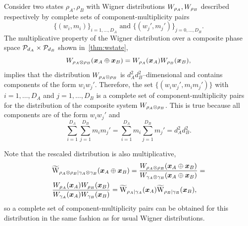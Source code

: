 Consider two states $\rho_A, \rho_B$ with Wigner distributions $\W{\rho_A}, \W{\rho_B}$ described respectively by complete sets of component-multiplicity pairs 
\begin{equation}
	\{(w_i, m_i)\}_{i=1,\dots,D_A} \text{ and } \{(w_j', m_j')\}_{j=0,\dots,D_B}.
\end{equation}
The multiplicative property of the Wigner distribution over a composite phase space $\cal{P}_{d_A} \times \cal{P}_{d_B}$ shown in~\cref{thm:wstate},
\begin{equation}
	\W[\bmx_A \oplus \bmx_B]{\rho_A \otimes \rho_B} = \W[\bmx_A]{\rho_A}\W[\bmx_B]{\rho_B},
\end{equation}
implies that the distribution $\W{\rho_A \otimes \rho_B}$ is $d_A^2 d_B^2$--dimensional and contains components of the form $w_i w_j'$. 
Therefore, the set $\{(w_i w_j', m_i m_j')\}$ with $i=1,\dots,D_A$ and $j=1,\dots,D_B$ is a complete set of component-multiplicity pairs for the distribution of the composite system $\W{\rho_A \otimes \rho_B}$.
This is true because all components are of the form $w_i w_j'$ and 
\begin{equation*}
	\sum_{i=1}^{D_A}\sum_{j=1}^{D_B} m_i m_j' = \sum_{i=1}^{D_A} m_i \sum_{j=1}^{D_B} m_j' = d_A^2 d_B^2.
\end{equation*}

Note that the rescaled distribution is also multiplicative,
\begin{align}
	&\widetilde{\rm{W}}_{\rho_A \otimes \rho_B | \gamma_A \otimes \gamma_B}(\bmx_A \oplus \bmx_B) = \frac{\W[\bmx_A \oplus \bmx_B]{\rho_A \otimes \rho_B}}{\W[\bmx_A \oplus \bmx_B]{\gamma_A \otimes \gamma_B}} = \nonumber \\
	&\frac{\W[\bmx_A]{\rho_A}\W[\bmx_B]{\rho_B}}{\W[\bmx_A]{\gamma_A}\W[\bmx_B]{\gamma_B}} = \widetilde{\rm{W}}_{\rho_A | \gamma_A}(\bmx_A)\widetilde{\rm{W}}_{\rho_B  | \gamma_B}(\bmx_B),
\end{align}
so a complete set of component-multiplicity pairs can be obtained for this distribution in the same fashion as for usual Wigner distributions.


